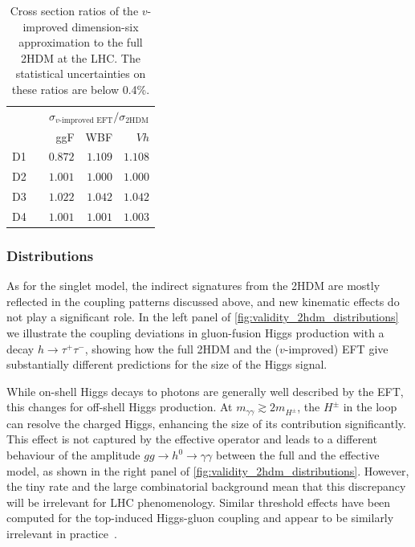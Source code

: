 \begin{table}
    \begin{tabular}{c c rrr}
      \toprule
      \multirow{2}{*}{}
      && \multicolumn{3}{c}{$\sigma_\text{$v$-improved EFT} / \sigma_\text{2HDM}$} \\
      \cmidrule{3-5}
      && ggF & WBF & $Vh$ \\
      \midrule
      D1 && $0.872$ & $1.109$ & $1.108$ \\
      D2 && $1.001$ & $1.000$ & $1.000$ \\
      D3 && $1.022$ & $1.042$ & $1.042$ \\
      D4 && $1.001$ & $1.001$ & $1.003$ \\
      \bottomrule
    \end{tabular}
    \caption[Total Higgs production rates in the 2HDM]{Cross
      section ratios of the $v$-improved dimension-six
      approximation to the full 2HDM at the LHC. The statistical
      uncertainties on these ratios are below 0.4\%.}
  \label{tbl:validity_2HDM_rates}
\end{table}



\subsubsection{Distributions}

As for the singlet model, the indirect signatures from the 2HDM are mostly
reflected in the coupling patterns discussed above, and new
kinematic effects do not play a significant role.  In the left panel of
\autoref{fig:validity_2hdm_distributions} we illustrate the coupling
deviations in gluon-fusion Higgs production with a decay
$h\to \tau^+ \tau^-$, showing how the full 2HDM and the ($v$-improved)
EFT give substantially different predictions for the size of the Higgs
signal.

While on-shell Higgs decays to photons are generally well described by
the EFT, this changes for off-shell Higgs production. At
$m_{\gamma \gamma} \gtrsim 2 m_{H^\pm}$, the $H^\pm$ in the loop can
resolve the charged Higgs, enhancing the size of its contribution
significantly. This effect is not captured by the effective operator
and leads to a different behaviour of the amplitude
$g g \to h^0 \to \gamma \gamma$ between the full and the effective model,
as shown in the right panel of
\autoref{fig:validity_2hdm_distributions}. However, the tiny rate
and the large combinatorial background mean that this discrepancy will
be irrelevant for LHC phenomenology. Similar threshold effects have
been computed for the top-induced Higgs-gluon coupling and appear to
be similarly irrelevant in practice~\cite{Buschmann:2014twa}.

